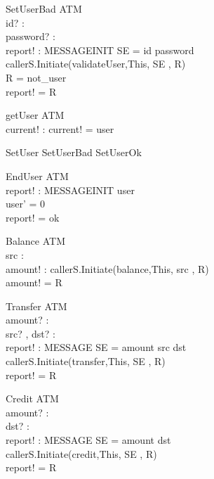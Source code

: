 \begin{schema}{SetUserBad}
\Xi ATM  \\ 
id? : \nat  \\ 
password? : \nat  \\ 
report! : MESSAGEINIT 
\where
SE = \lseq id password  \rseq \\
callerS.Initiate(validateUser,This,  SE  , R) \\
R = not\_user \\
report! = R 
\end{schema}

\begin{schema}{getUser}
\Xi ATM  \\ 
current! : \nat  
\where
current! = user
\end{schema}

\begin{zed}
SetUser \sdef  SetUserBad \lor   SetUserOk
\end{zed}


\begin{schema}{EndUser}
\Delta ATM \\ 
report! : MESSAGEINIT 
\where
user  \\
user' = 0 \\
report! = ok 
\end{schema}

\begin{schema}{Balance}
\Xi ATM \\ 
src : \nat \\ 
amount! : \nat   
\where
callerS.Initiate(balance,This,  src  , R) \\
amount! = R 
\end{schema}

\begin{schema}{Transfer}
\Delta ATM \\ 
amount? : \nat  \\ 
src? , dst? : \nat \\
report! : MESSAGE 
\where
SE = \lseq amount src dst  \rseq \\
callerS.Initiate(transfer,This,  SE  , R) \\
report! = R 
\end{schema}


\begin{schema}{Credit}
\Delta ATM \\ 
amount? : \nat  \\ 
dst? : \nat \\
report! : MESSAGE 
\where
SE = \lseq amount dst  \rseq \\
callerS.Initiate(credit,This,  SE  , R) \\
report! = R 
\end{schema}


